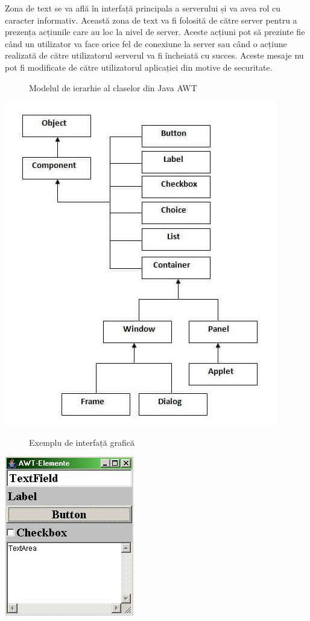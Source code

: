 \documentclass{article}
\begin{document}
	Zona de text se va află în interfață principala a serverului și va avea rol cu caracter informativ. Această zona de text va fi folosită de către server pentru a prezența acțiunile care au loc la nivel de server. Aceste acțiuni pot să prezinte fie când un utilizator va face orice fel de conexiune la server sau când o acțiune realizată de către utilizatorul serverul va fi încheiată cu succes. Aceste mesaje nu pot fi modificate de către utilizatorul aplicației din motive de securitate. \\

		\begin{center}
		\begin{figure}[!h]
			{\caption*{Modelul de ierarhie al claselor din Java AWT}}
		\end{figure}
			\includegraphics[scale=0.8]{Source/AWT}
		\end{center}
		\begin{center}
		\begin{figure}[!h]
			{\caption*{Exemplu de interfață grafică}}
		\end{figure}
			\includegraphics[scale=3.5]{Source/ExempluAWT}
		\end{center}
\end{document}
